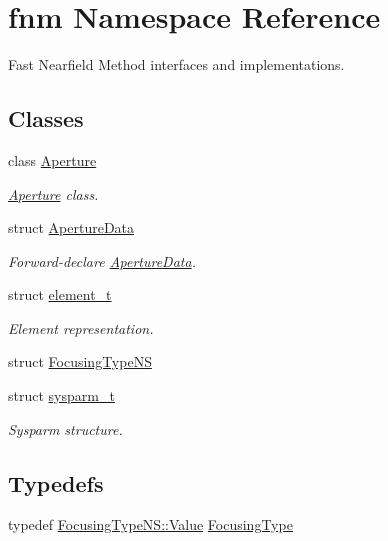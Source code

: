\hypertarget{namespacefnm}{\section{fnm Namespace Reference}
\label{namespacefnm}
}


Fast Nearfield Method interfaces and implementations.  


\subsection*{Classes}
\begin{DoxyCompactItemize}
\item 
class \hyperlink{classfnm_1_1Aperture}{Aperture}
\begin{DoxyCompactList}\small\item\em \hyperlink{classfnm_1_1Aperture}{Aperture} class. \end{DoxyCompactList}\item 
struct \hyperlink{singletonfnm_1_1ApertureData}{Aperture\+Data}
\begin{DoxyCompactList}\small\item\em Forward-\/declare \hyperlink{singletonfnm_1_1ApertureData}{Aperture\+Data}. \end{DoxyCompactList}\item 
struct \hyperlink{structfnm_1_1element__t}{element\+\_\+t}
\begin{DoxyCompactList}\small\item\em Element representation. \end{DoxyCompactList}\item 
struct \hyperlink{structfnm_1_1FocusingTypeNS}{Focusing\+Type\+N\+S}
\item 
struct \hyperlink{structfnm_1_1sysparm__t}{sysparm\+\_\+t}
\begin{DoxyCompactList}\small\item\em Sysparm structure. \end{DoxyCompactList}\end{DoxyCompactItemize}
\subsection*{Typedefs}
\begin{DoxyCompactItemize}
\item 
typedef \hyperlink{structfnm_1_1FocusingTypeNS_a896c037a32087c5c20d97e64a1786880}{Focusing\+Type\+N\+S\+::\+Value} \hyperlink{namespacefnm_ac5c8ed1b3501db991ccb6065c89c3b54}{Focusing\+Type}
\end{DoxyCompactItemize}
